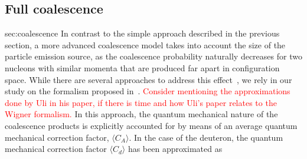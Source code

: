 \documentclass[a4paper,11pt]{scrartcl} %
\begin{document}
\subsection{Full coalescence}{sec:coalescence}
In contrast to the simple approach described in the previous section, a more advanced coalescence model takes into account the size of the particle emission source, as the coalescence probability naturally decreases for two nucleons with similar momenta that are produced far apart in configuration space. While there are several approaches to address this effect~\cite{PapersWithWignerCitedinUli}, we rely in our study on the formalism proposed in~\cite{Scheibl:1998tk}. \textcolor{red}{Consider mentioning the approximations done by Uli in his paper, if there is time and how Uli's paper relates to the Wigner formalism.}
In this approach, the quantum mechanical nature of the coalescence products is explicitly accounted for by means of an average quantum mechanical correction factor, $\langle C_{A} \rangle$. In the case of the deuteron, the quantum mechanical correction factor $\langle C_{d} \rangle$ has been approximated as 
\end{document}
